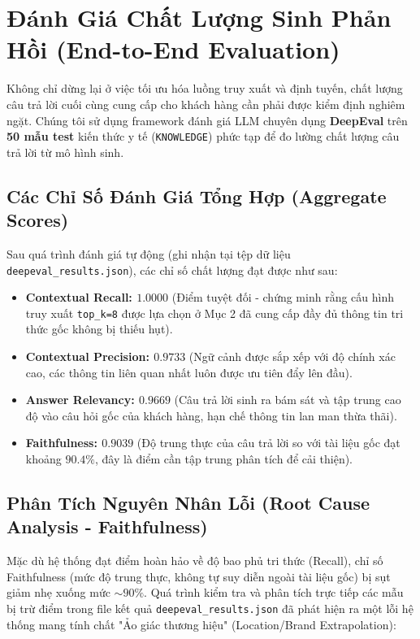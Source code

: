 \documentclass[11pt, a4paper]{article}
\begin{document}
\newpage
\section{Đánh Giá Chất Lượng Sinh Phản Hồi (End-to-End Evaluation)}
Không chỉ dừng lại ở việc tối ưu hóa luồng truy xuất và định tuyến, chất lượng câu trả lời cuối cùng cung cấp cho khách hàng cần phải được kiểm định nghiêm ngặt. Chúng tôi sử dụng framework đánh giá LLM chuyên dụng \textbf{DeepEval} trên \textbf{50 mẫu test} kiến thức y tế (\texttt{KNOWLEDGE}) phức tạp để đo lường chất lượng câu trả lời từ mô hình sinh.

\subsection{Các Chỉ Số Đánh Giá Tổng Hợp (Aggregate Scores)}
Sau quá trình đánh giá tự động (ghi nhận tại tệp dữ liệu \texttt{deepeval\_results.json}), các chỉ số chất lượng đạt được như sau:
\begin{itemize}
    \item \textbf{Contextual Recall: $1.0000$} (Điểm tuyệt đối - chứng minh rằng cấu hình truy xuất \texttt{top\_k=8} được lựa chọn ở Mục 2 đã cung cấp đầy đủ thông tin tri thức gốc không bị thiếu hụt).
    \item \textbf{Contextual Precision: $0.9733$} (Ngữ cảnh được sắp xếp với độ chính xác cao, các thông tin liên quan nhất luôn được ưu tiên đẩy lên đầu).
    \item \textbf{Answer Relevancy: $0.9669$} (Câu trả lời sinh ra bám sát và tập trung cao độ vào câu hỏi gốc của khách hàng, hạn chế thông tin lan man thừa thãi).
    \item \textbf{Faithfulness: $0.9039$} (Độ trung thực của câu trả lời so với tài liệu gốc đạt khoảng $90.4\%$, đây là điểm cần tập trung phân tích để cải thiện).
\end{itemize}

\subsection{Phân Tích Nguyên Nhân Lỗi (Root Cause Analysis - Faithfulness)}
Mặc dù hệ thống đạt điểm hoàn hảo về độ bao phủ tri thức (Recall), chỉ số Faithfulness (mức độ trung thực, không tự suy diễn ngoài tài liệu gốc) bị sụt giảm nhẹ xuống mức $\sim 90\%$. Quá trình kiểm tra và phân tích trực tiếp các mẫu bị trừ điểm trong file kết quả \texttt{deepeval\_results.json} đã phát hiện ra một lỗi hệ thống mang tính chất "Ảo giác thương hiệu" (Location/Brand Extrapolation):
\end{document}
